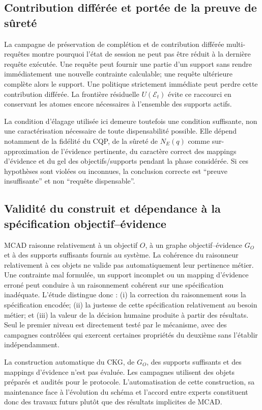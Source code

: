 \documentclass[journal]{IEEEtran}
\begin{document}
\subsection{Contribution différée et portée de la preuve de sûreté}

La campagne de préservation de complétion et de contribution différée multi-requêtes montre pourquoi l'état de session ne peut pas être réduit à la dernière requête exécutée. Une requête peut fournir une partie d'un support sans rendre immédiatement une nouvelle contrainte calculable; une requête ultérieure complète alors le support. Une politique strictement immédiate peut perdre cette contribution différée. La frontière résiduelle $U(\mathcal{E}_t)$ évite ce raccourci en conservant les atomes encore nécessaires à l'ensemble des supports actifs.

La condition d'élagage utilisée ici demeure toutefois une condition suffisante, non une caractérisation nécessaire de toute dispensabilité possible. Elle dépend notamment de la fidélité du CQP, de la sûreté de $N_E(q)$ comme sur-approximation de l'évidence pertinente, du caractère correct des mappings d'évidence et du gel des objectifs/supports pendant la phase considérée. Si ces hypothèses sont violées ou inconnues, la conclusion correcte est ``preuve insuffisante'' et non ``requête dispensable''.

\subsection{Validité du construit et dépendance à la spécification objectif--évidence}

MCAD raisonne relativement à un objectif $O$, à un graphe objectif--évidence $G_O$ et à des supports suffisants fournis au système. La cohérence du raisonneur relativement à ces objets ne valide pas automatiquement leur pertinence métier. Une contrainte mal formulée, un support incomplet ou un mapping d'évidence erroné peut conduire à un raisonnement cohérent sur une spécification inadéquate. L'étude distingue donc : (i) la correction du raisonnement sous la spécification encodée; (ii) la justesse de cette spécification relativement au besoin métier; et (iii) la valeur de la décision humaine produite à partir des résultats. Seul le premier niveau est directement testé par le mécanisme, avec des campagnes contrôlées qui exercent certaines propriétés du deuxième sans l'établir indépendamment.

La construction automatique du CKG, de $G_O$, des supports suffisants et des mappings d'évidence n'est pas évaluée. Les campagnes utilisent des objets préparés et audités pour le protocole. L'automatisation de cette construction, sa maintenance face à l'évolution du schéma et l'accord entre experts constituent donc des travaux futurs plutôt que des résultats implicites de MCAD.
\end{document}
